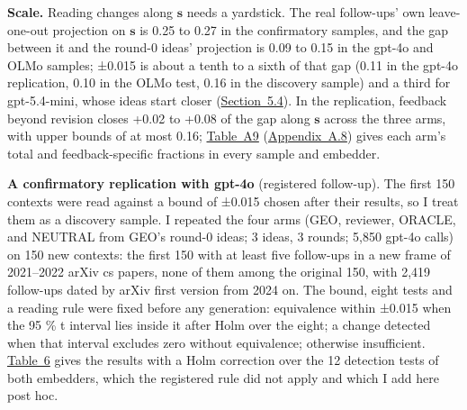 \documentclass[
  10pt,
]{article}
\begin{document}
\textbf{Scale.} Reading changes along
\(\mathbf{s}\) needs a yardstick. The
real follow-ups' own leave-one-out
projection on \(\mathbf{s}\) is 0.25 to
0.27 in the confirmatory samples, and
the gap between it and the round-0
ideas' projection is 0.09 to 0.15 in the
gpt-4o and OLMo samples; ±0.015 is about
a tenth to a sixth of that gap (0.11 in
the gpt-4o replication, 0.10 in the OLMo
test, 0.16 in the discovery sample) and
a third for gpt-5.4-mini, whose ideas
start closer
(\hyperref[sec:5.4]{Section~5.4}). In
the replication, feedback beyond
revision closes +0.02 to +0.08 of the
gap along \(\mathbf{s}\) across the
three arms, with upper bounds of at most
0.16; \hyperref[tab:A9]{Table~A9}
(\hyperref[app:A.8]{Appendix~A.8}) gives
each arm's total and feedback-specific
fractions in every sample and embedder.

\textbf{A confirmatory replication with
gpt-4o} (registered follow-up). The
first 150 contexts were read against a
bound of ±0.015 chosen after their
results, so I treat them as a discovery
sample. I repeated the four arms (GEO,
reviewer, ORACLE, and NEUTRAL from GEO's
round-0 ideas; 3 ideas, 3 rounds; 5,850
gpt-4o calls) on 150 new contexts: the
first 150 with at least five follow-ups
in a new frame of 2021--2022 arXiv cs
papers, none of them among the original
150, with 2,419 follow-ups dated by
arXiv first version from 2024 on. The
bound, eight tests and a reading rule
were fixed before any generation:
equivalence within ±0.015 when the 95 \%
t interval lies inside it after Holm
over the eight; a change detected when
that interval excludes zero without
equivalence; otherwise insufficient.
\hyperref[tab:6]{Table~6} gives the
results with a Holm correction over the
12 detection tests of both embedders,
which the registered rule did not apply
and which I add here post hoc.
\end{document}
